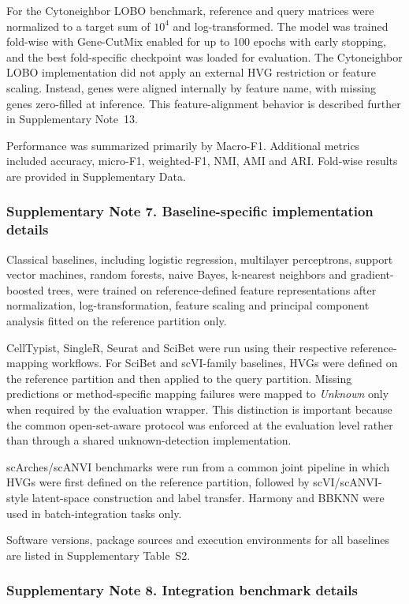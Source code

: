 \documentclass[11pt]{article}
\begin{document}
For the Cytoneighbor LOBO benchmark, reference and query matrices were normalized to a target sum of $10^4$ and log-transformed. The model was trained fold-wise with Gene-CutMix enabled for up to 100 epochs with early stopping, and the best fold-specific checkpoint was loaded for evaluation. The Cytoneighbor LOBO implementation did not apply an external HVG restriction or feature scaling. Instead, genes were aligned internally by feature name, with missing genes zero-filled at inference. This feature-alignment behavior is described further in Supplementary Note~13.

Performance was summarized primarily by Macro-F1. Additional metrics included accuracy, micro-F1, weighted-F1, NMI, AMI and ARI. Fold-wise results are provided in Supplementary Data.

\subsubsection*{Supplementary Note 7. Baseline-specific implementation details}

Classical baselines, including logistic regression, multilayer perceptrons, support vector machines, random forests, naive Bayes, k-nearest neighbors and gradient-boosted trees, were trained on reference-defined feature representations after normalization, log-transformation, feature scaling and principal component analysis fitted on the reference partition only.

CellTypist, SingleR, Seurat and SciBet were run using their respective reference-mapping workflows. For SciBet and scVI-family baselines, HVGs were defined on the reference partition and then applied to the query partition. Missing predictions or method-specific mapping failures were mapped to \textit{Unknown} only when required by the evaluation wrapper. This distinction is important because the common open-set-aware protocol was enforced at the evaluation level rather than through a shared unknown-detection implementation.

scArches/scANVI benchmarks were run from a common joint pipeline in which HVGs were first defined on the reference partition, followed by scVI/scANVI-style latent-space construction and label transfer. Harmony and BBKNN were used in batch-integration tasks only.

Software versions, package sources and execution environments for all baselines are listed in Supplementary Table~S2.

\subsubsection*{Supplementary Note 8. Integration benchmark details}
\end{document}
